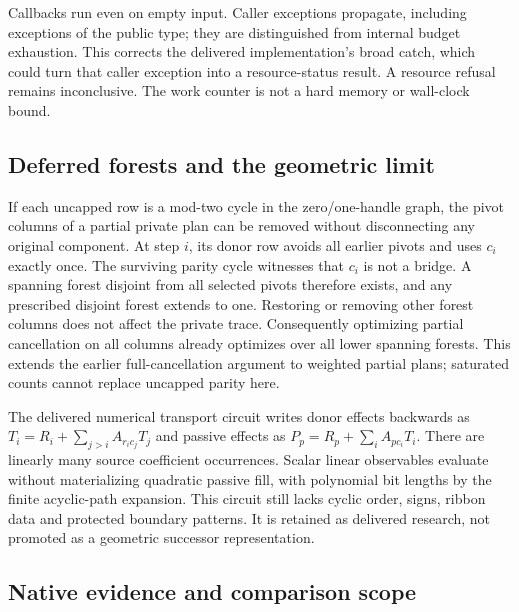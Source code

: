 Callbacks run even on empty input.  Caller exceptions propagate,
including exceptions of the public  type;
they are distinguished from internal budget exhaustion.  This corrects
the delivered implementation's broad catch, which could turn that caller
exception into a resource-status result.  A resource refusal remains
inconclusive.  The work counter is not a hard memory or wall-clock bound.

\subsection{Deferred forests and the geometric limit}

If each uncapped row is a mod-two cycle in the zero/one-handle graph, the
pivot columns of a partial private plan can be removed without disconnecting
any original component.  At step $i$, its donor row avoids all earlier
pivots and uses $c_i$ exactly once.  The surviving parity cycle witnesses
that $c_i$ is not a bridge.  A spanning forest disjoint from all selected
pivots therefore exists, and any prescribed disjoint forest extends to one.
Restoring or removing other forest columns does not affect the private
trace.  Consequently optimizing partial cancellation on all columns
already optimizes over all lower spanning forests.  This extends the
earlier full-cancellation argument to weighted partial plans; saturated
counts cannot replace uncapped parity here.

The delivered numerical transport circuit writes donor effects backwards
as $T_i=R_i+\sum_{j>i}A_{r_i c_j}T_j$ and passive effects as
$P_p=R_p+\sum_i A_{p c_i}T_i$.  There are linearly many source coefficient
occurrences.  Scalar linear observables evaluate without materializing
quadratic passive fill, with polynomial bit lengths by the finite
acyclic-path expansion.  This circuit still lacks cyclic order, signs,
ribbon data and protected boundary patterns.  It is retained as delivered
research, not promoted as a geometric successor representation.

\subsection{Native evidence and comparison scope}

